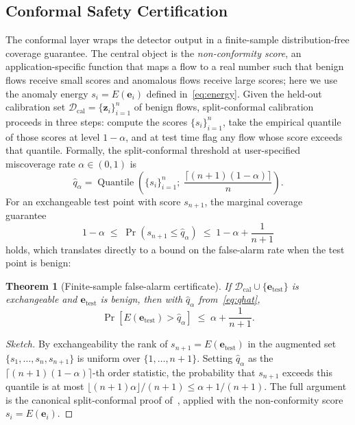 \documentclass{ieeeaccess}
\newtheorem{theorem}{Theorem}
\DeclareMathOperator{\Quantile}{Quantile}
\begin{document}
\subsection{Conformal Safety Certification}
\label{sec:method:certify}
The conformal layer wraps the detector output in a finite-sample
distribution-free coverage guarantee. The central object is the
\emph{non-conformity score}, an application-specific function that maps a
flow to a real number such that benign flows receive small scores and
anomalous flows receive large scores; here we use the anomaly energy
$s_i = E(\mathbf{e}_i)$ defined in~\eqref{eq:energy}. Given the held-out
calibration set $\mathcal{D}_\text{cal} = \{\mathbf{z}_i\}_{i=1}^n$ of
benign flows, split-conformal calibration proceeds in three steps:
compute the scores $\{s_i\}_{i=1}^n$, take the empirical quantile of
those scores at level $1-\alpha$, and at test time flag any flow whose
score exceeds that quantile. Formally, the split-conformal threshold at
user-specified miscoverage rate $\alpha \in (0,1)$ is
\begin{equation}
\hat{q}_\alpha = \Quantile\!\left(\{s_i\}_{i=1}^n;\; \frac{\lceil(n+1)(1-\alpha)\rceil}{n}\right).
\label{eq:qhat}
\end{equation}
For an exchangeable test point with score $s_{n+1}$, the marginal
coverage guarantee~\cite{vovk2022alrw,angelopoulos2023gentle}
\begin{equation}
1 - \alpha \;\le\; \Pr(s_{n+1} \le \hat{q}_\alpha) \;\le\; 1 - \alpha + \frac{1}{n+1}
\label{eq:cpguarantee}
\end{equation}
holds, which translates directly to a bound on the false-alarm rate when
the test point is benign:

\begin{theorem}[Finite-sample false-alarm certificate]
\label{thm:far}
If $\mathcal{D}_\text{cal} \cup \{\mathbf{e}_\text{test}\}$ is exchangeable
and $\mathbf{e}_\text{test}$ is benign, then with $\hat{q}_\alpha$
from~\eqref{eq:qhat},
\begin{equation}
\Pr\!\left[E(\mathbf{e}_\text{test}) > \hat{q}_\alpha\right] \;\le\; \alpha + \frac{1}{n+1}.
\end{equation}
\end{theorem}

\begin{proof}[Sketch]
By exchangeability the rank of $s_{n+1} = E(\mathbf{e}_\text{test})$ in
the augmented set $\{s_1,\dots,s_n,s_{n+1}\}$ is uniform over
$\{1,\dots,n+1\}$. Setting $\hat{q}_\alpha$ as the
$\lceil(n+1)(1-\alpha)\rceil$-th order statistic, the probability that
$s_{n+1}$ exceeds this quantile is at most
$\lfloor(n+1)\alpha\rfloor/(n+1) \le \alpha + 1/(n+1)$. The full argument
is the canonical split-conformal proof
of~\cite{vovk2022alrw,angelopoulos2023gentle}, applied with the
non-conformity score $s_i = E(\mathbf{e}_i)$.
\end{proof}
\end{document}
